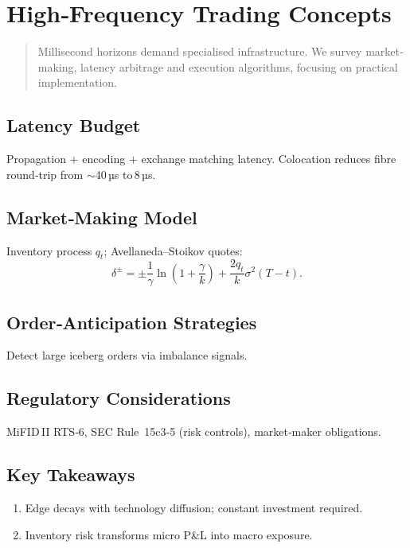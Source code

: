 \chapter{High‑Frequency Trading Concepts}\label{ch:hft}

\begin{abstract}
Millisecond horizons demand specialised infrastructure.
We survey market‐making, latency arbitrage and execution
algorithms, focusing on practical implementation.
\end{abstract}

\section{Latency Budget}

Propagation \(+\) encoding \(+\) exchange matching latency.
Colocation reduces fibre round‑trip from \(\sim\)40 µs to 8 µs.

\section{Market‑Making Model}

Inventory process \(q_t\); Avellaneda–Stoikov quotes:
\[
\delta^{\pm} = \pm\frac{1}{\gamma}\ln\left(1+\frac{\gamma}{k}\right)
              + \frac{2q_t}{k}\sigma^2(T-t).
\]

\section{Order‐Anticipation Strategies}

Detect large iceberg orders via imbalance signals.

\section{Regulatory Considerations}

MiFID II RTS‑6, SEC Rule 15c3‑5 (risk controls), market‑maker obligations.

\section*{Key Takeaways}

\begin{enumerate}
  \item Edge decays with technology diffusion; constant investment required.
  \item Inventory risk transforms micro P\&L into macro exposure.
\end{enumerate}
